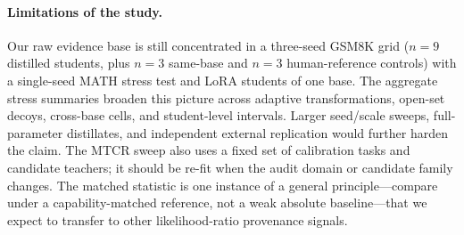 \paragraph{Limitations of the study.}
Our raw evidence base is still concentrated in a three-seed GSM8K grid ($n\!=\!9$
distilled students, plus $n\!=\!3$ same-base and $n\!=\!3$ human-reference controls)
with a single-seed MATH stress test and LoRA students of one base. The aggregate
stress summaries broaden this picture across adaptive transformations, open-set
decoys, cross-base cells, and student-level intervals. Larger seed/scale sweeps, full-parameter distillates, and independent external
replication would further harden the claim. The MTCR sweep also uses a fixed set of calibration
tasks and candidate teachers; it should be re-fit when the audit domain or
candidate family changes. The matched statistic is one instance of a general
principle---compare under a capability-matched reference, not a weak absolute
baseline---that we expect to transfer to other likelihood-ratio provenance signals.
